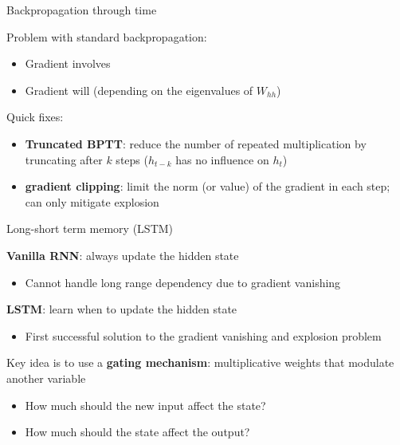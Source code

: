 \documentclass[usenames,dvipsnames,notes,11pt,aspectratio=169,hyperref={colorlinks=true, linkcolor=blue}]{beamer}
\begin{document}
\begin{frame}
    {Backpropagation through time}
    
    Problem with standard backpropagation:\\
    \begin{itemize}
        \item Gradient involves 
        \item Gradient will  (depending on the eigenvalues of $W_{hh}$)
    \end{itemize}

    \pause
    Quick fixes:\\
    \begin{itemize}
        \item {\bf Truncated BPTT}: reduce the number of repeated multiplication by truncating after $k$ steps ($h_{t-k}$ has no influence on $h_t$)
        \item {\bf gradient clipping}: limit the norm (or value) of the gradient in each step; can only mitigate explosion
    \end{itemize}
\end{frame}

\begin{frame}
    {Long-short term memory (LSTM)}

    \textbf{Vanilla RNN}: always update the hidden state\\
    \begin{itemize}
        \item Cannot handle long range dependency due to gradient vanishing 
    \end{itemize}
    \pause

    \textbf{LSTM}: learn when to update the hidden state\\
    \begin{itemize}
        \item First successful solution to the gradient vanishing and explosion problem 
    \end{itemize}
    \pause

    Key idea is to use a \textbf{gating mechanism}: multiplicative weights that modulate another variable \\
    \begin{itemize}
        \item How much should the new input affect the state?
        \item How much should the state affect the output? 
    \end{itemize}
\end{frame}
\end{document}

